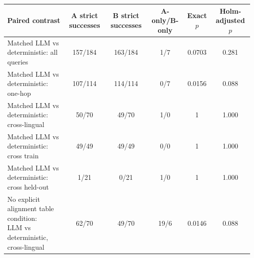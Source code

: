 \begin{tabular}{p{5.0cm}ccccc}
\toprule
Paired contrast & A strict successes & B strict successes & A-only/B-only & Exact $p$ & Holm-adjusted $p$ \\
\midrule
Matched LLM vs deterministic: all queries & 157/184 & 163/184 & 1/7 & 0.0703 & 0.281 \\
Matched LLM vs deterministic: one-hop & 107/114 & 114/114 & 0/7 & 0.0156 & 0.088 \\
Matched LLM vs deterministic: cross-lingual & 50/70 & 49/70 & 1/0 & 1 & 1.000 \\
Matched LLM vs deterministic: cross train & 49/49 & 49/49 & 0/0 & 1 & 1.000 \\
Matched LLM vs deterministic: cross held-out & 1/21 & 0/21 & 1/0 & 1 & 1.000 \\
\shortstack[l]{No explicit alignment table condition:\\LLM vs deterministic, cross-lingual} & 62/70 & 49/70 & 19/6 & 0.0146 & 0.088 \\
\bottomrule
\end{tabular}
